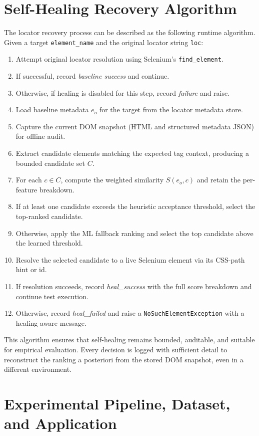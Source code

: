 \documentclass[conference]{IEEEtran}
\begin{document}
\section{Self-Healing Recovery Algorithm}
\label{sec:algorithm}
The locator recovery process can be described as the following runtime algorithm. Given a target \texttt{element\_name} and the original locator string \texttt{loc}:
\begin{enumerate}[leftmargin=1.2em]
    \item Attempt original locator resolution using Selenium's \texttt{find\_element}.
    \item If successful, record \emph{baseline success} and continue.
    \item Otherwise, if healing is disabled for this step, record \emph{failure} and raise.
    \item Load baseline metadata $e_o$ for the target from the locator metadata store.
    \item Capture the current DOM snapshot (HTML and structured metadata JSON) for offline audit.
    \item Extract candidate elements matching the expected tag context, producing a bounded candidate set $C$.
    \item For each $c \in C$, compute the weighted similarity $S(e_o, c)$ and retain the per-feature breakdown.
    \item If at least one candidate exceeds the heuristic acceptance threshold, select the top-ranked candidate.
    \item Otherwise, apply the ML fallback ranking and select the top candidate above the learned threshold.
    \item Resolve the selected candidate to a live Selenium element via its CSS-path hint or id.
    \item If resolution succeeds, record \emph{heal\_success} with the full score breakdown and continue test execution.
    \item Otherwise, record \emph{heal\_failed} and raise a \texttt{NoSuchElementException} with a healing-aware message.
\end{enumerate}
This algorithm ensures that self-healing remains bounded, auditable, and suitable for empirical evaluation. Every decision is logged with sufficient detail to reconstruct the ranking a posteriori from the stored DOM snapshot, even in a different environment.

\section{Experimental Pipeline, Dataset, and Application}
\label{sec:pipeline}
\end{document}
